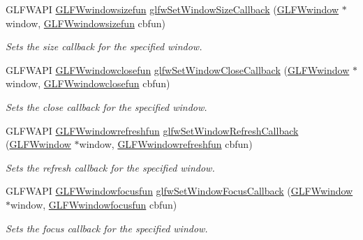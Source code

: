 \begin{DoxyCompactItemize}
\-G\-L\-F\-W\-A\-P\-I \hyperlink{group__window_gaaca1c2715759d03da9834eac19323d4a}{\-G\-L\-F\-Wwindowsizefun} \hyperlink{group__window_ga150dad5f364425916c5816074cffa5e7}{glfw\-Set\-Window\-Size\-Callback} (\hyperlink{group__window_ga3c96d80d363e67d13a41b5d1821f3242}{\-G\-L\-F\-Wwindow} $\ast$window, \hyperlink{group__window_gaaca1c2715759d03da9834eac19323d4a}{\-G\-L\-F\-Wwindowsizefun} cbfun)
\begin{DoxyCompactList}\small\item\em \-Sets the size callback for the specified window. \end{DoxyCompactList}\item 
\-G\-L\-F\-W\-A\-P\-I \hyperlink{group__window_ga07cff8bd3b3d573ecf49bb02d7669c1f}{\-G\-L\-F\-Wwindowclosefun} \hyperlink{group__window_ga5b827da350141c789acd64f5c4f7a0e1}{glfw\-Set\-Window\-Close\-Callback} (\hyperlink{group__window_ga3c96d80d363e67d13a41b5d1821f3242}{\-G\-L\-F\-Wwindow} $\ast$window, \hyperlink{group__window_ga07cff8bd3b3d573ecf49bb02d7669c1f}{\-G\-L\-F\-Wwindowclosefun} cbfun)
\begin{DoxyCompactList}\small\item\em \-Sets the close callback for the specified window. \end{DoxyCompactList}\item 
\-G\-L\-F\-W\-A\-P\-I \hyperlink{group__window_ga16764f89bf2060e6fa477f0943e1412b}{\-G\-L\-F\-Wwindowrefreshfun} \hyperlink{group__window_ga9d2621fbc271a0cdc0ce91f9749f46e3}{glfw\-Set\-Window\-Refresh\-Callback} (\hyperlink{group__window_ga3c96d80d363e67d13a41b5d1821f3242}{\-G\-L\-F\-Wwindow} $\ast$window, \hyperlink{group__window_ga16764f89bf2060e6fa477f0943e1412b}{\-G\-L\-F\-Wwindowrefreshfun} cbfun)
\begin{DoxyCompactList}\small\item\em \-Sets the refresh callback for the specified window. \end{DoxyCompactList}\item 
\-G\-L\-F\-W\-A\-P\-I \hyperlink{group__window_ga6b5f973531ea91663ad707ba4f2ac104}{\-G\-L\-F\-Wwindowfocusfun} \hyperlink{group__window_gac89c6534ba7fbab6f6c68b855656c0d4}{glfw\-Set\-Window\-Focus\-Callback} (\hyperlink{group__window_ga3c96d80d363e67d13a41b5d1821f3242}{\-G\-L\-F\-Wwindow} $\ast$window, \hyperlink{group__window_ga6b5f973531ea91663ad707ba4f2ac104}{\-G\-L\-F\-Wwindowfocusfun} cbfun)
\begin{DoxyCompactList}\small\item\em \-Sets the focus callback for the specified window. \end{DoxyCompactList}\item 

\end{DoxyCompactItemize}
